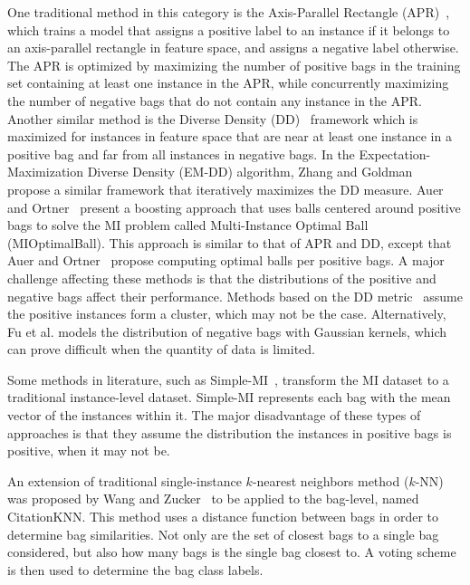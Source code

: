 \documentclass[reqno]{vcuthesis}
\numberwithin{equation}{chapter}
\begin{document}
One traditional method in this category is the Axis-Parallel Rectangle (APR)~\cite{Dietterich1997}, which trains a model that assigns a positive label to an instance if it belongs to an axis-parallel rectangle in feature space, and assigns a negative label otherwise. The APR is optimized by maximizing the number of positive bags in the training set containing at least one instance in the APR, while concurrently maximizing the number of negative bags that do not contain any instance in the APR. Another similar method is the Diverse Density (DD)~\cite{Maron1998} framework which is maximized for instances in feature space that are near at least one instance in a positive bag and far from all instances in negative bags. In the Expectation-Maximization Diverse Density (EM-DD) algorithm, Zhang and Goldman~\cite{Zhang2001} propose a similar framework that iteratively maximizes the DD measure. Auer and Ortner~\cite{Auer2004} present a boosting approach that uses balls centered around positive bags to solve the MI problem called Multi-Instance Optimal Ball (MIOptimalBall). This approach is similar to that of APR and DD, except that Auer and Ortner~\cite{Auer2004} propose computing optimal balls per positive bags. A major challenge affecting these methods is that the distributions of the positive and negative bags affect their performance. Methods based on the DD metric~\cite{Carbonneau2016,Chen2006,Chen2004} assume the positive instances form a cluster, which may not be the case. Alternatively, Fu et al.\cite{Fu2011} models the distribution of negative bags with Gaussian kernels, which can prove difficult when the quantity of data is limited.

Some methods in literature, such as Simple-MI~\cite{Dong2006}, transform the MI dataset to a traditional instance-level dataset. Simple-MI represents each bag with the mean vector of the instances within it. The major disadvantage of these types of approaches is that they assume the distribution the instances in positive bags is positive, when it may not be.

An extension of traditional single-instance $k$-nearest neighbors method ($k$-NN) was proposed by Wang and Zucker~\cite{Wang2000} to be applied to the bag-level, named CitationKNN. This method uses a distance function between bags in order to determine bag similarities. Not only are the set of closest bags to a single bag  considered, but also how many bags is the single bag closest to. A voting scheme is then used to determine the bag class labels.
\end{document}
